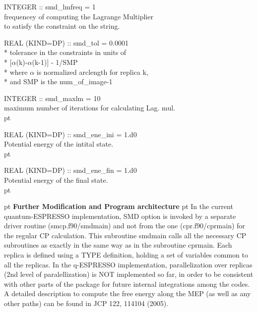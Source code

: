 \documentclass[aps,prb,preprint,groupedaddress]{revtex4}
\begin{document}
INTEGER :: smd\_lmfreq = 1 \\
\- \hspace{40pt} frequencey of computing the Lagrange Multiplier  \\
\- \hspace{40pt} to satisfy the constraint on the string. \\ \vskip 10pt

REAL (KIND=DP) :: smd\_tol = 0.0001 \\*
\- \hspace{40pt} tolerance in the constraints in units of  \\*
\- \hspace{40pt} [$\alpha$(k)-$\alpha$(k-1)] - 1/SMP \\*
\- \hspace{40pt} where $\alpha$ is normalized arclength for replica k, \\*
\- \hspace{40pt} and SMP is the num\_of\_image-1  \\ \vskip 10pt

INTEGER :: smd\_maxlm = 10 \\
\- \hspace{40pt} maximum number of iterations for calculating 
Lag. mul. \\  pt

REAL (KIND=DP) :: smd\_ene\_ini = 1.d0 \\
\- \hspace{40pt} Potential energy of the intital state. \\  pt

REAL (KIND=DP) :: smd\_ene\_fin = 1.d0 \\
\- \hspace{40pt} Potential energy of the final state. \\  pt


 pt
\noindent
{\large \bf Further Modification and Program architecture}
 pt
\noindent
In the current quantum-ESPRESSO implementation, SMD option is invoked by a separate driver routine (smcp.f90/smdmain) 
and not from the one (cpr.f90/cprmain) for the regular CP calculation.
This subroutine smdmain calls all the necessary CP subroutines as exactly in the same way as in the subroutine cprmain.
Each replica is defined using a TYPE definition, holding a set of variables common to all the replicas.
In the q-ESPRESSO implementation, parallelization over replicas (2nd level of paralellization) is NOT implemented so far, 
in order to be consistent with other parts of the package for future internal integrations among the codes. 
A detailed description to compute the free energy along the MEP (as well as any other paths) can be
found in JCP 122, 114104 (2005).     
\end{document}
